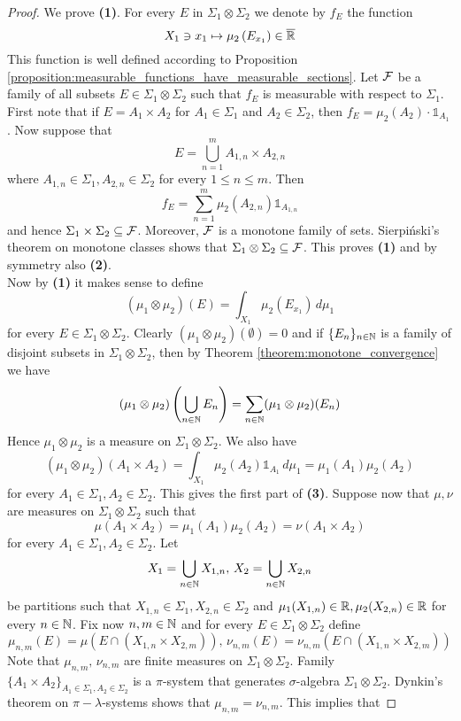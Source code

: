 \begin{proof}
    We prove \textbf{(1)}. For every $E$ in $\Sigma_1\otimes \Sigma_2$ we denote by $f_E$ the function
    $$X_1\ni x_1 \mapsto \mu_2\left(E_{x_1}\right)\in \overline{{\mathbb R}}$$
    This function is well defined according to Proposition \ref{proposition:measurable_functions_have_measurable_sections}. Let ${\mathcal F}$ be a family of all subsets $E\in \Sigma_1\otimes \Sigma_2$ such that $f_E$ is measurable with respect to $\Sigma_1$. First note that if $E=A_1 \times A_2$ for $A_1\in \Sigma_1$ and $A_2\in \Sigma_2$, then  $f_E = \mu_2(A_2)\cdot \mathbb{1}_{A_1}$. Now suppose that
    $$E= \bigcup_{n=1}^mA_{1,n}\times A_{2,n}$$
    where $A_{1,n}\in \Sigma_1,A_{2,n}\in \Sigma_2$ for every $1\leq n\leq m$. Then
    $$f_E = \sum_{n=1}^m\mu_2(A_{2,n})\mathbb{1}_{A_{1,n}}$$
    and hence $\Sigma_1\times \Sigma_2\subseteq {\mathcal F}$. Moreover, ${\mathcal F}$ is a monotone family of sets. Sierpiński's theorem on monotone classes shows that $\Sigma_1\otimes \Sigma_2\subseteq {\mathcal F}$. This proves \textbf{(1)} and by symmetry also \textbf{(2)}.\\ Now by \textbf{(1)} it makes sense to define
    $$(\mu_1\otimes \mu_2)(E) = \int_{X_1}\mu_2(E_{x_1})\,d\mu_1$$
    for every $E\in \Sigma_1\otimes \Sigma_2$. Clearly $(\mu_1\otimes \mu_2)(\emptyset) = 0$ and if $\{E_n\}_{n\in {\mathbb N}}$ is a family of disjoint subsets in $\Sigma_1\otimes \Sigma_2$, then by Theorem \ref{theorem:monotone_convergence} we have
    $$(\mu_1\otimes \mu_2)\left(\bigcup_{n\in {\mathbb N}}E_n\right) = \sum_{n\in {\mathbb N}}(\mu_1\otimes \mu_2)(E_n)$$
    Hence $\mu_1\otimes \mu_2$ is a measure on $\Sigma_1\otimes \Sigma_2$. We also have
    $$(\mu_1\otimes \mu_2)\left(A_1\times A_2\right) = \int_{X_1}\mu_2(A_2)\mathbb{1}_{A_1}\,d\mu_1 = \mu_1(A_1)\mu_2(A_2)$$
    for every $A_1\in \Sigma_1, A_2\in \Sigma_2$. This gives the first part of \textbf{(3)}. Suppose now that $\mu,\nu$ are measures on $\Sigma_1\otimes \Sigma_2$ such that
    $$\mu(A_1\times A_2) = \mu_1(A_1)\mu_2(A_2) = \nu(A_1\times A_2)$$
    for every $A_1\in \Sigma_1,A_2\in \Sigma_2$. Let
    $$X_1 = \bigcup_{n\in {\mathbb N}}X_{1,n},\,X_2 = \bigcup_{n\in {\mathbb N}}X_{2,n}$$
    be partitions such that $X_{1,n}\in \Sigma_1,X_{2,n}\in \Sigma_2$ and $\mu_1(X_{1,n})\in {\mathbb R},\mu_2(X_{2,n})\in {\mathbb R}$ for every $n\in {\mathbb N}$. Fix now $n,m\in {\mathbb N}$ and for every $E\in \Sigma_1\otimes \Sigma_2$ define
    $$\mu_{n,m}(E) = \mu\left(E\cap (X_{1,n}\times  X_{2,m})\right),\,\nu_{n,m}(E) = \nu_{n,m}\left(E\cap (X_{1,n}\times X_{2,m})\right)$$
    Note that $\mu_{n,m},\,\nu_{n,m}$ are finite measures on $\Sigma_1\otimes \Sigma_2$. Family $\big\{A_1\times A_2\big\}_{A_1\in \Sigma_1,A_2\in \Sigma_2}$ is a $\pi$-system that generates $\sigma$-algebra $\Sigma_1\otimes \Sigma_2$. Dynkin's theorem on $\pi-\lambda$-systems shows that $\mu_{n,m} = \nu_{n,m}$. This implies that

\end{proof}
